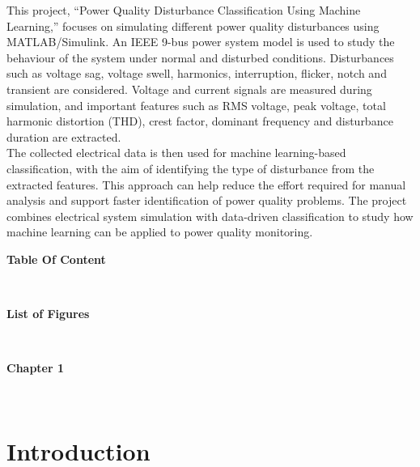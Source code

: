 \documentclass[12pt]{article}
\begin{document}
\begin{center}
This project, “Power Quality Disturbance Classification Using Machine Learning,” focuses on simulating different power quality disturbances using MATLAB/Simulink. An IEEE 9-bus power system model is used to study the behaviour of the system under normal and disturbed conditions. Disturbances such as voltage sag, voltage swell, harmonics, interruption, flicker, notch and transient are considered. Voltage and current signals are measured during simulation, and important features such as RMS voltage, peak voltage, total harmonic distortion (THD), crest factor, dominant frequency and disturbance duration are extracted.\\

The collected electrical data is then used for machine learning-based classification, with the aim of identifying the type of disturbance from the extracted features. This approach can help reduce the effort required for manual analysis and support faster identification of power quality problems. The project combines electrical system simulation with data-driven classification to study how machine learning can be applied to power quality monitoring.\\
\clearpage
\begin{center}
    \vspace{2cm}
    \textbf{\LARGE Table Of Content}\\[2cm]
\end{center}\\
\tableofcontents

\clearpage


\begin{center}
    \vspace{2cm}
    \textbf{\LARGE List of Figures}\\[2cm]
\end{center}\\
\listoffigures
\clearpage



\begin{center}
    \vspace{2cm}
    \textbf{\LARGE Chapter 1}\\[2cm]
\end{center}\\
\section{Introduction}


\end{center}
\end{document}
